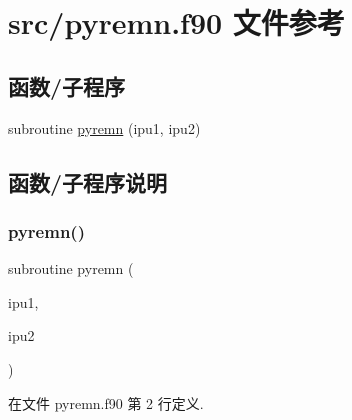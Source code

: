 \hypertarget{pyremn_8f90}{}\section{src/pyremn.f90 文件参考}
\label{pyremn_8f90}
\subsection*{函数/子程序}
\begin{DoxyCompactItemize}
\item 
subroutine \mbox{\hyperlink{pyremn_8f90_aec11e5150c39912f06575d8f61a5d250}{pyremn}} (ipu1, ipu2)
\end{DoxyCompactItemize}


\subsection{函数/子程序说明}
\mbox{\label{pyremn_8f90_aec11e5150c39912f06575d8f61a5d250}} 
\subsubsection{\texorpdfstring{pyremn()}{pyremn()}}
{\footnotesize\ttfamily subroutine pyremn (\begin{DoxyParamCaption}\item[{}]{ipu1,  }\item[{}]{ipu2 }\end{DoxyParamCaption})}



在文件 pyremn.\+f90 第 2 行定义.


